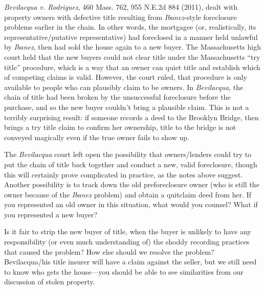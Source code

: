 
\textit{Bevilacqua v. Rodriguez}, 460 Mass. 762, 955 N.E.2d 884 (2011), dealt
with property owners with defective title resulting from
\textit{Ibanez}-style foreclosure problems earlier in the chain. 
In other words, the mortgagee (or, realistically, its representative/putative
representative) had foreclosed in a manner held unlawful by \textit{Ibanez},
then had sold the house again to a new buyer. The Massachusetts high court
held that the new buyers could not clear title under the Massachusetts ``try
title'' procedure, which is a way that an owner can quiet title and establish
which of competing claims is valid. However, the court ruled, that procedure
is only available to people who can plausibly claim to be owners. In
\textit{Bevilacqua}, the chain of title had been broken by the unsuccessful
foreclosure before the purchase, and so the new buyer couldn't bring a
plausible claim. This is not a terribly surprising result: if someone records
a deed to the Brooklyn Bridge, then brings a try title claim to confirm her
ownership, title to the bridge is not conveyed magically even if the true owner
fails to show up. 

The \textit{Bevilacqua} court left open the possibility that owners/lenders
could try to put the chain of title back together and conduct a new, valid
foreclosure, though this will certainly prove complicated in practice, as the
notes above suggest. Another possibility is to track down the old
preforeclosure owner (who is still the owner because of the \textit{Ibanez}
problem) and obtain a quitclaim deed from her. If you represented an old owner
in this situation, what would you counsel? What if you represented a new
buyer?

Is it fair to strip the new buyer of title, when the buyer is unlikely to have
any responsibility (or even much understanding of) the shoddy recording
practices that caused the problem? How else should we resolve the problem? 
Bevilacqua/his title insurer will have a claim against the seller, but we still
need to know who gets the house---you should be able to see similarities from
our discussion of stolen property.


